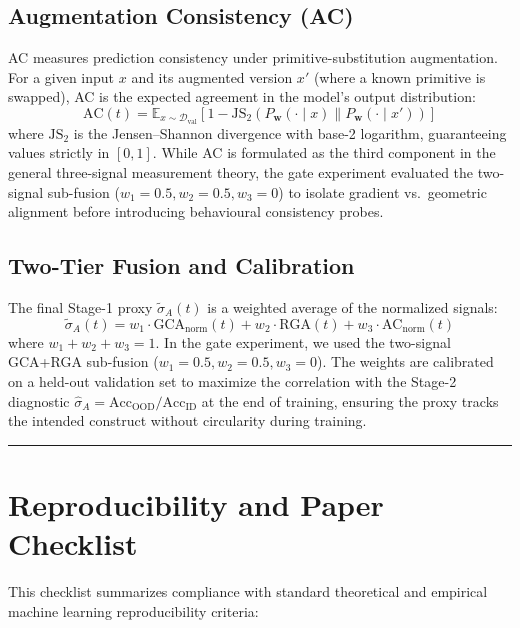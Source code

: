 \documentclass{article}
\theoremstyle{definition}
\begin{document}
\subsection{Augmentation Consistency (AC)}
AC measures prediction consistency under primitive-substitution augmentation. For a given input $x$ and its augmented version $x'$ (where a known primitive is swapped), AC is the expected agreement in the model's output distribution:
\begin{equation}
\text{AC}(t) = \mathbb{E}_{x \sim \mathcal{D}_{\text{val}}} \left[ 1 - \text{JS}_2(P_{\mathbf{w}}(\cdot \mid x) \parallel P_{\mathbf{w}}(\cdot \mid x')) \right]
\end{equation}
where $\text{JS}_2$ is the Jensen--Shannon divergence with base-2 logarithm, guaranteeing values strictly in $[0, 1]$. While AC is formulated as the third component in the general three-signal measurement theory, the gate experiment evaluated the two-signal sub-fusion ($w_1=0.5, w_2=0.5, w_3=0$) to isolate gradient vs.\ geometric alignment before introducing behavioural consistency probes.

\subsection{Two-Tier Fusion and Calibration}
The final Stage-1 proxy $\tilde{\sigma}_A(t)$ is a weighted average of the normalized signals:
\begin{equation}
\tilde{\sigma}_A(t) = w_1 \cdot \text{GCA}_{\text{norm}}(t) + w_2 \cdot \text{RGA}(t) + w_3 \cdot \text{AC}_{\text{norm}}(t)
\end{equation}
where $w_1 + w_2 + w_3 = 1$. In the gate experiment, we used the two-signal GCA+RGA sub-fusion ($w_1=0.5, w_2=0.5, w_3=0$). The weights are calibrated on a held-out validation set to maximize the correlation with the Stage-2 diagnostic $\hat{\sigma}_A = \text{Acc}_{\text{OOD}} / \text{Acc}_{\text{ID}}$ at the end of training, ensuring the proxy tracks the intended construct without circularity during training.

\noindent\rule{\linewidth}{0.4pt}

\section{Reproducibility and Paper Checklist}\label{app:checklist}

This checklist summarizes compliance with standard theoretical and empirical machine learning reproducibility criteria:
\end{document}
